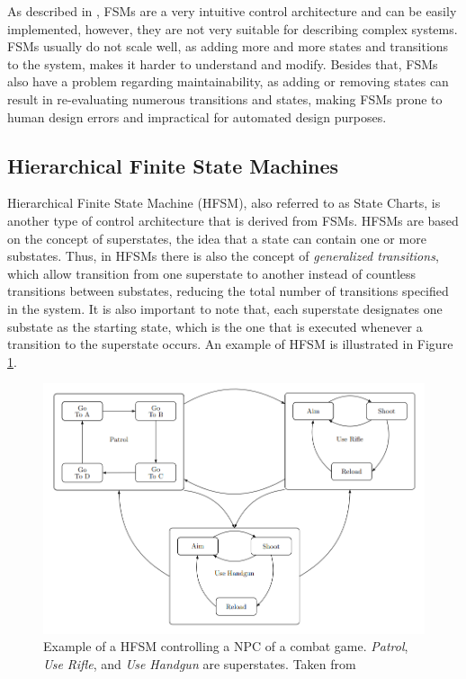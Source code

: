 As described in \cite{BTsInRobotics}, FSMs are a very intuitive control architecture and can be easily implemented, however, they are not very suitable for describing complex systems. FSMs usually do not scale well, as adding more and more states and transitions to the system, makes it harder to understand and modify. Besides that, FSMs also have a problem regarding maintainability, as adding or removing states can result in re-evaluating numerous transitions and states, making FSMs prone to human design errors and impractical for automated design purposes.

\subsection{Hierarchical Finite State Machines}

Hierarchical Finite State Machine (HFSM), also referred to as State Charts, is another type of control architecture that is derived from FSMs. HFSMs are based on the concept of superstates, the idea that a state can contain one or more substates. Thus, in HFSMs there is also the concept of \textit{generalized transitions}, which allow transition from one superstate to another instead of countless transitions between substates, reducing the total number of transitions specified in the system. It is also important to note that, each superstate designates one substate as the starting state, which is the one that is executed whenever a transition to the superstate occurs. An example of HFSM is illustrated in Figure \ref{fig:hfsm_example}.

\begin{figure}
    \centering
    \includegraphics[width=0.75\linewidth]{chapters/background/images/HFSM Example.png}
    \caption{Example of a HFSM controlling a NPC of a combat game. \textit{Patrol}, \textit{Use Rifle}, and \textit{Use Handgun} are superstates. Taken from \cite{BTsInRobotics}}
    \label{fig:hfsm_example}
\end{figure}

